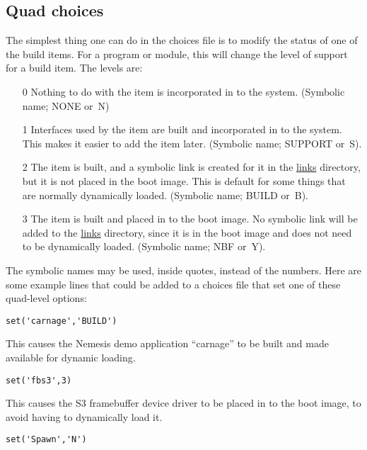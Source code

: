 \documentclass[a4paper]{article}
\begin{document}
\subsection{Quad choices}

The simplest thing one can do in the choices file is to modify the
status of one of the build items. For a program or module, this will
change the level of support for a build item. The levels are:

\begin{itemize}
\item[0] Nothing to do with the item is incorporated in to the
system. (Symbolic name; NONE or~N)

\item[1] Interfaces used by the item are built and incorporated in to
the system. This makes it easier to add the item later. (Symbolic
name; SUPPORT or~S).

\item[2] The item is built, and a symbolic link is created for it in
the \url{links} directory, but it is not placed in the boot image. This is
default for some things that are normally dynamically loaded. (Symbolic
name; BUILD or~B).

\item[3] The item is built and placed in to the boot image. No symbolic
link will be added to the \url{links} directory, since it is in the
boot image and does not need to be dynamically loaded. (Symbolic name; NBF
or~Y).
\end{itemize}

The symbolic names may be used, inside quotes, instead of the numbers.
Here are some example lines that could be added to a choices file that
set one of these quad-level options:

\begin{verbatim}
set('carnage','BUILD')
\end{verbatim}

This causes the Nemesis demo application ``carnage'' to be built and
made available for dynamic loading.

\begin{verbatim}
set('fbs3',3)
\end{verbatim}

This causes the S3 framebuffer device driver to be placed in to the
boot image, to avoid having to dynamically load it. 

\begin{verbatim}
set('Spawn','N')
\end{verbatim}
\end{document}
